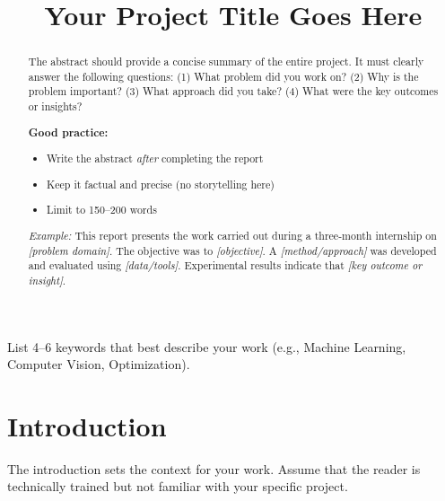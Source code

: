 \documentclass{article}
\title{Your Project Title Goes Here}
\begin{document}
\ninept
\maketitle


\begin{abstract}
The abstract should provide a concise summary of the entire project.
It must clearly answer the following questions:
(1) What problem did you work on?
(2) Why is the problem important?
(3) What approach did you take?
(4) What were the key outcomes or insights?

\textbf{Good practice:}
\begin{itemize}[noitemsep]
    \item Write the abstract \emph{after} completing the report
    \item Keep it factual and precise (no storytelling here)
    \item Limit to 150--200 words
\end{itemize}

\emph{Example:}
This report presents the work carried out during a three-month internship on 
\emph{[problem domain]}. The objective was to \emph{[objective]}. A 
\emph{[method/approach]} was developed and evaluated using \emph{[data/tools]}. 
Experimental results indicate that \emph{[key outcome or insight]}.
\end{abstract}

\begin{keywords}
List 4--6 keywords that best describe your work (e.g., Machine Learning, Computer Vision, Optimization).
\end{keywords}

\section{Introduction}

The introduction sets the context for your work. Assume that the reader is 
technically trained but not familiar with your specific project.
\end{document}
